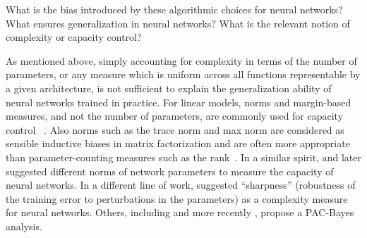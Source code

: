 \documentclass{article}
\begin{document}

What is the bias introduced by these algorithmic choices for neural
networks?  What ensures generalization in neural networks?  What is
the relevant notion of complexity or capacity control?

As mentioned above, simply accounting for complexity in terms of the
number of parameters, or any measure which is uniform across all
functions representable by a given architecture, is not sufficient to
explain the generalization ability of neural networks trained in
practice.  For linear models, norms and margin-based measures, and not
the number of parameters, are commonly used for capacity control~
\cite{bartlett2002rademacher, evgeniou2000regularization,
  smola1998connection}. Also norms such as the trace norm and max norm
are considered as sensible inductive biases in matrix factorization
and are often more appropriate than parameter-counting measures such
as the rank~\cite{srebro2005rank,srebro2005maximum}. In a similar
spirit, \citet{bartlett1998sample} and later \citet{neyshabur15b}
suggested different norms of network parameters to measure the
capacity of neural networks.  In a different line of work,
\citet{keskar2016large} suggested ``sharpness'' (robustness of the
training error to perturbations in the parameters) as a complexity
measure for neural networks.  Others, including
\citet{langford2001not} and more recently
\citet{dziugaite2017computing}, propose a PAC-Bayes analysis.
\end{document}
